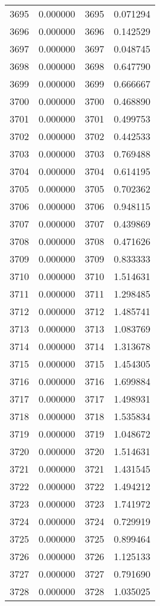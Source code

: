 \documentclass[12pt]{article}
\begin{document}
\begin{longtable}{@{}cccc@{}}
3695 & 0.000000 & 3695 & 0.071294 \\
3696 & 0.000000 & 3696 & 0.142529 \\
3697 & 0.000000 & 3697 & 0.048745 \\
3698 & 0.000000 & 3698 & 0.647790 \\
3699 & 0.000000 & 3699 & 0.666667 \\
3700 & 0.000000 & 3700 & 0.468890 \\
3701 & 0.000000 & 3701 & 0.499753 \\
3702 & 0.000000 & 3702 & 0.442533 \\
3703 & 0.000000 & 3703 & 0.769488 \\
3704 & 0.000000 & 3704 & 0.614195 \\
3705 & 0.000000 & 3705 & 0.702362 \\
3706 & 0.000000 & 3706 & 0.948115 \\
3707 & 0.000000 & 3707 & 0.439869 \\
3708 & 0.000000 & 3708 & 0.471626 \\
3709 & 0.000000 & 3709 & 0.833333 \\
3710 & 0.000000 & 3710 & 1.514631 \\
3711 & 0.000000 & 3711 & 1.298485 \\
3712 & 0.000000 & 3712 & 1.485741 \\
3713 & 0.000000 & 3713 & 1.083769 \\
3714 & 0.000000 & 3714 & 1.313678 \\
3715 & 0.000000 & 3715 & 1.454305 \\
3716 & 0.000000 & 3716 & 1.699884 \\
3717 & 0.000000 & 3717 & 1.498931 \\
3718 & 0.000000 & 3718 & 1.535834 \\
3719 & 0.000000 & 3719 & 1.048672 \\
3720 & 0.000000 & 3720 & 1.514631 \\
3721 & 0.000000 & 3721 & 1.431545 \\
3722 & 0.000000 & 3722 & 1.494212 \\
3723 & 0.000000 & 3723 & 1.741972 \\
3724 & 0.000000 & 3724 & 0.729919 \\
3725 & 0.000000 & 3725 & 0.899464 \\
3726 & 0.000000 & 3726 & 1.125133 \\
3727 & 0.000000 & 3727 & 0.791690 \\
3728 & 0.000000 & 3728 & 1.035025 \\

\end{longtable}
\end{document}

